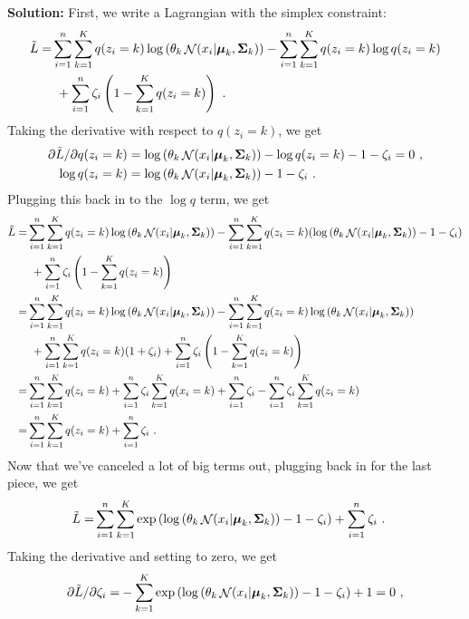 \documentclass[10pt]{article}
\newcommand{\bmu}{{\boldsymbol \mu}}
\newcommand{\bSigma}{{\boldsymbol \Sigma}}
\DeclareMathOperator*{\normal}{{\cal N}}
\newcommand{\solution}[1]{{\color{PineGreen} \textbf{Solution:} #1}}
\begin{document}
\begin{enumerate}
\begin{enumerate}
\solution{
First, we write a Lagrangian with the simplex constraint:
\begin{align*}
\tilde{L} =& \sum_{i=1}^n \sum_{k = 1}^K q(z_i = k) \log\left(\theta_k \normal(x_i | \bmu_k, \bSigma_k)\right) - \sum_{i=1}^n \sum_{k=1}^K q(z_i = k) \log q(z_i = k) \\
&~ + \sum_{i=1}^n \zeta_i \left( 1 - \sum_{k=1}^K q(z_i = k) \right) ~.
\end{align*}
Taking the derivative with respect to $q(z_i = k)$, we get
\begin{align*}
\partial \tilde{L} / \partial q(z_i = k) & = \log\left(\theta_k \normal(x_i | \bmu_k, \bSigma_k)\right) - \log q(z_i = k) - 1 - \zeta_i = 0 ~, \\
\log q(z_i = k) & = \log\left(\theta_k \normal(x_i | \bmu_k, \bSigma_k)\right) - 1 - \zeta_i ~.
\end{align*}
Plugging this back in to the $\log q$ term, we get
\begin{align*}
\tilde{L} =& \sum_{i=1}^n \sum_{k = 1}^K q(z_i = k) \log\left(\theta_k \normal(x_i | \bmu_k, \bSigma_k)\right) - \sum_{i=1}^n \sum_{k=1}^K q(z_i = k) (\log\left(\theta_k \normal(x_i | \bmu_k, \bSigma_k)\right) - 1 - \zeta_i )  \\
&~ + \sum_{i=1}^n \zeta_i \left( 1 - \sum_{k=1}^K q(z_i = k) \right)\\
=& \sum_{i=1}^n \sum_{k = 1}^K q(z_i = k) \log\left(\theta_k \normal(x_i | \bmu_k, \bSigma_k)\right) - \sum_{i=1}^n \sum_{k=1}^K q(z_i = k) \log\left(\theta_k \normal(x_i | \bmu_k, \bSigma_k)\right)\\
&~ + \sum_{i=1}^n \sum_{k=1}^K q(z_i = k) (1 + \zeta_i) + \sum_{i=1}^n \zeta_i \left( 1 - \sum_{k=1}^K q(z_i = k) \right)\\
=& \sum_{i=1}^n \sum_{k=1}^K q(z_i = k) + \sum_{i=1}^n \zeta_i \sum_{k=1}^K q(x_i = k) + \sum_{i=1}^n \zeta_i  - \sum_{i=1}^n \zeta_i \sum_{k=1}^K q(z_i = k) \\
=& \sum_{i=1}^n \sum_{k=1}^K q(z_i = k) + \sum_{i=1}^n \zeta_i ~.
\end{align*}
Now that we've canceled a lot of big terms out, plugging back in for the last piece, we get
\begin{align*}
\tilde{L} =& \sum_{i=1}^n \sum_{k=1}^K \exp\left(\log\left(\theta_k \normal(x_i | \bmu_k, \bSigma_k)\right) - 1 - \zeta_i \right) + \sum_{i=1}^n \zeta_i ~.
\end{align*}
Taking the derivative and setting to zero, we get
\begin{align*}
\partial \tilde{L} / \partial \zeta_i =& - \sum_{k=1}^K \exp\left(\log\left(\theta_k \normal(x_i | \bmu_k, \bSigma_k)\right) - 1 - \zeta_i \right) + 1 = 0 ~, \\

\end{align*}}
\end{enumerate}
\end{enumerate}
\end{document}
